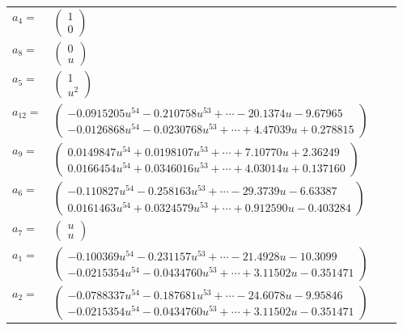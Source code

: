 \documentclass[1p]{elsarticle_modified}
\theoremstyle{definition}
\begin{document}
\begin{tabular}{m{7pt} m{180pt} m{7pt} m{180pt} }
\flushright $a_{4}=$&$\begin{pmatrix}1\\0\end{pmatrix}$ \\
\flushright $a_{8}=$&$\begin{pmatrix}0\\u\end{pmatrix}$ \\
\flushright $a_{5}=$&$\begin{pmatrix}1\\u^2\end{pmatrix}$ \\
\flushright $a_{12}=$&$\begin{pmatrix}-0.0915205 u^{54}-0.210758 u^{53}+\cdots-20.1374 u-9.67965\\-0.0126868 u^{54}-0.0230768 u^{53}+\cdots+4.47039 u+0.278815\end{pmatrix}$ \\
\flushright $a_{9}=$&$\begin{pmatrix}0.0149847 u^{54}+0.0198107 u^{53}+\cdots+7.10770 u+2.36249\\0.0166454 u^{54}+0.0346016 u^{53}+\cdots+4.03014 u+0.137160\end{pmatrix}$ \\
\flushright $a_{6}=$&$\begin{pmatrix}-0.110827 u^{54}-0.258163 u^{53}+\cdots-29.3739 u-6.63387\\0.0161463 u^{54}+0.0324579 u^{53}+\cdots+0.912590 u-0.403284\end{pmatrix}$ \\
\flushright $a_{7}=$&$\begin{pmatrix}u\\u\end{pmatrix}$ \\
\flushright $a_{1}=$&$\begin{pmatrix}-0.100369 u^{54}-0.231157 u^{53}+\cdots-21.4928 u-10.3099\\-0.0215354 u^{54}-0.0434760 u^{53}+\cdots+3.11502 u-0.351471\end{pmatrix}$ \\
\flushright $a_{2}=$&$\begin{pmatrix}-0.0788337 u^{54}-0.187681 u^{53}+\cdots-24.6078 u-9.95846\\-0.0215354 u^{54}-0.0434760 u^{53}+\cdots+3.11502 u-0.351471\end{pmatrix}$ \\

\end{tabular}
\end{document}
